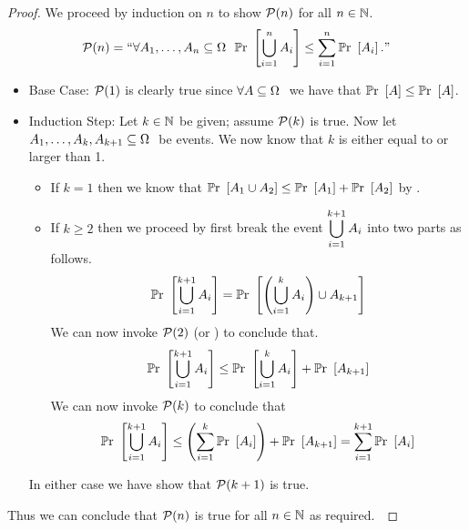         \begin{proof}
            We proceed by induction on $n$ to show $\mathcal{P}(n)$ for all $n \in \mathbb{N}$.
            \[
                \mathcal{P}(n) = ``\forall A_1, \dots, A_n \subseteq \Omega \  \
                                     \mathbb{P}\mathrm{r}~\left[\displaystyle\bigcup_{i = 1}^{n} A_i\right] \le \sum_{i = 1}^{n} \mathbb{P}\mathrm{r}~\left[A_i\right]."
            \]
            \begin{itemize}
                \item
                    Base Case: $\mathcal{P}(1)$ is clearly true since $\forall A \subseteq \Omega \ $
                    we have that $\mathbb{P}\mathrm{r}~\left[A\right] \le \mathbb{P}\mathrm{r}~\left[A\right]$.
                \item
                    Induction Step: Let $k \in \mathbb{N}$ be given; assume $\mathcal{P}(k)$ is true.
                    Now let $A_1, \dots, A_k, A_{k + 1} \subseteq \Omega \ $ be events. We now know that
                    $k$ is either equal to or larger than 1.
                    \begin{itemize}
                        \item
                            If $k = 1$ then we know that $\mathbb{P}\mathrm{r}~\left[A_1 \cup A_2\right] \le \mathbb{P}\mathrm{r}~\left[A_1\right] + \mathbb{P}\mathrm{r}~\left[A_2\right]$
                            by \CorollaryRef{Union Bound n = 2}.
                        \item
                            If $k \ge 2$ then we proceed by first break the event $\displaystyle\bigcup_{i = 1}^{k + 1} A_i$
                            into two parts as follows.
                            \[
                                \mathbb{P}\mathrm{r}~\left[\displaystyle\bigcup_{i = 1}^{k + 1} A_i\right] = 
                                \mathbb{P}\mathrm{r}~\left[\left(\displaystyle\bigcup_{i = 1}^{k} A_i\right) \cup A_{k + 1}\right]
                            \]
                            We can now invoke $\mathcal{P}(2)$ (or ) to
                            conclude that.
                            \[
                                \mathbb{P}\mathrm{r}~\left[\displaystyle\bigcup_{i = 1}^{k + 1} A_i\right] \le
                                \mathbb{P}\mathrm{r}~\left[\displaystyle\bigcup_{i = 1}^{k} A_i\right] + \mathbb{P}\mathrm{r}~\left[A_{k + 1}\right]
                            \]
                            We can now invoke $\mathcal{P}(k)$ to conclude that
                            \[
                                \mathbb{P}\mathrm{r}~\left[\displaystyle\bigcup_{i = 1}^{k + 1} A_i\right] \le
                                \left(\sum_{i = 1}^{k} \mathbb{P}\mathrm{r}~\left[A_i\right]\right) + \mathbb{P}\mathrm{r}~\left[A_{k + 1}\right] = \sum_{i = 1}^{k + 1} \mathbb{P}\mathrm{r}~\left[A_i\right]
                            \]
                    \end{itemize}
                    In either case we have show that $\mathcal{P}(k + 1)$ is true.
            \end{itemize}
            Thus we can conclude that $\mathcal{P}(n)$ is true for all $n \in \mathbb{N}$
            as required.~\QED
        \end{proof}

